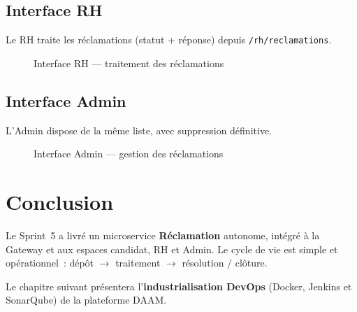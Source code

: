 \subsection{Interface RH}

Le RH traite les réclamations (statut + réponse) depuis
\texttt{/rh/reclamations}.

\begin{figure}[H]
  \centering
  \caption{Interface RH --- traitement des réclamations}
  \label{fig:ui-rh-reclamations}
\end{figure}


\subsection{Interface Admin}

L'Admin dispose de la même liste, avec suppression définitive.

\begin{figure}[H]
  \centering
  \caption{Interface Admin --- gestion des réclamations}
  \label{fig:ui-admin-reclamations}
\end{figure}


\section{Conclusion}

Le Sprint~5 a livré un microservice \textbf{Réclamation} autonome,
intégré à la Gateway et aux espaces candidat, RH et Admin. Le cycle de
vie est simple et opérationnel~: dépôt $\rightarrow$ traitement
$\rightarrow$ résolution / clôture.

Le chapitre suivant présentera l'\textbf{industrialisation DevOps}
(Docker, Jenkins et SonarQube) de la plateforme DAAM.

\clearpage

